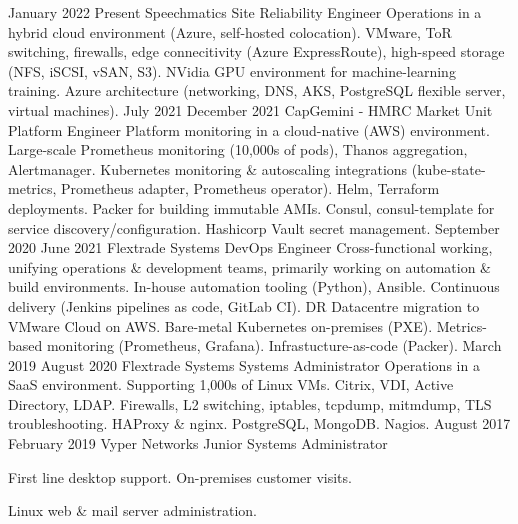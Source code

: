 \documentclass[9pt]{developercv}
\begin{document}
    \begin{entrylist}
        \entry
            {\dateentry
                {January 2022}
                {Present}
            }
            {Speechmatics}
            {Site Reliability Engineer}
            {
                Operations in a hybrid cloud environment (Azure, self-hosted colocation).
                VMware, ToR switching, firewalls, edge connecitivity (Azure ExpressRoute),
                high-speed storage (NFS, iSCSI, vSAN, S3).
                NVidia GPU environment for machine-learning training.
                Azure architecture (networking, DNS, AKS, PostgreSQL flexible server, virtual machines).
            }
        \entry
            {\dateentry
                {July 2021}
                {December 2021}
            }
            {CapGemini - HMRC Market Unit}
            {Platform Engineer}
            {
                Platform monitoring in a cloud-native (AWS) environment.
                Large-scale Prometheus monitoring (10,000s of pods), Thanos aggregation, Alertmanager.
                Kubernetes monitoring \& autoscaling integrations
                (kube-state-metrics, Prometheus adapter, Prometheus operator).
                Helm, Terraform deployments.
                Packer for building immutable AMIs.
                Consul, consul-template for service discovery/configuration.
                Hashicorp Vault secret management.
            }
        \entry
            {\dateentry
                {September 2020}
                {June 2021}
            }
            {Flextrade Systems}
            {DevOps Engineer}
            {
                Cross-functional working, unifying operations \& development teams,
                primarily working on automation \& build environments.
                In-house automation tooling (Python), Ansible.
                Continuous delivery (Jenkins pipelines as code, GitLab CI).
                DR Datacentre migration to VMware Cloud on AWS.
                Bare-metal Kubernetes on-premises (PXE).
                Metrics-based monitoring (Prometheus, Grafana).
                Infrastucture-as-code (Packer).
            }
        \entry
            {\dateentry
                {March 2019}
                {August 2020}
            }
            {Flextrade Systems}
            {Systems Administrator}
            {
                Operations in a SaaS environment.
                Supporting 1,000s of Linux VMs.
                Citrix, VDI, Active Directory, LDAP.
                Firewalls, L2 switching, iptables, tcpdump, mitmdump, TLS troubleshooting.
                HAProxy \& nginx. PostgreSQL, MongoDB. Nagios.
            }
        \entry
            {\dateentry
                {August 2017}
                {February 2019}
            }
            {Vyper Networks}
            {Junior Systems Administrator}
            {
                First line desktop support.
                On-premises customer visits.

                Linux web \& mail server administration.
            }
    \end{entrylist}
\end{document}
